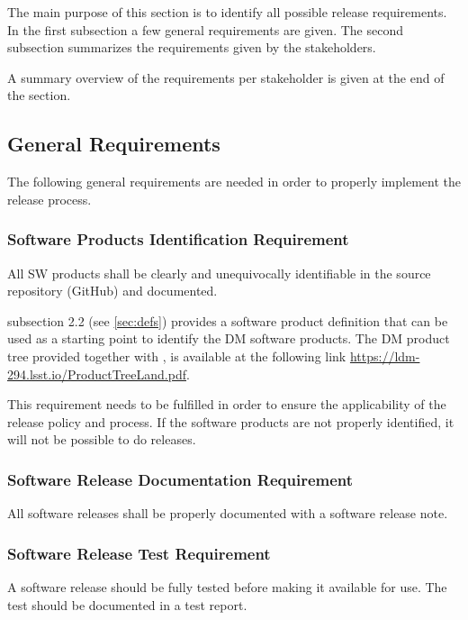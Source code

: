 The main purpose of this section is to identify all possible release requirements.
In the first subsection a few general requirements are given.
The second subsection summarizes the requirements given by the stakeholders.

A summary overview of the requirements per stakeholder is given at the end of the section.


\subsection{General Requirements} \label{sec:genreq}

The following general requirements are needed in order to properly implement the release process.


\subsubsection{Software Products Identification Requirement} \label{sec:swid}

All \gls{SW} products shall be clearly and unequivocally identifiable in the source repository (GitHub) and documented.

 subsection 2.2 (see \ref{sec:defs}) provides a software product definition that can be used as a starting point to identify the DM software products.
The DM product tree provided together with , is available at the following link \url{https://ldm-294.lsst.io/ProductTreeLand.pdf}.

This requirement needs to be fulfilled in order to ensure the applicability of the release policy and process.
If the software products are not properly identified, it will not be possible to do releases.


\subsubsection{Software Release Documentation Requirement} \label{sec:reqdoc}

All software releases shall be properly documented with a software release note.


\subsubsection{Software Release Test Requirement} \label{sec:test}

A software release should be fully tested before making it available for use.
The test should be documented in a test report.



